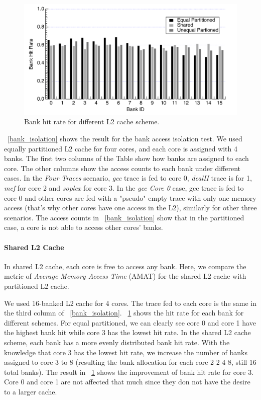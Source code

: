 \documentclass[12pt]{report}
\newcommand{\Fig}[1]{\figurename~\ref{#1}}
\newcommand{\Tbl}[1]{\tablename~\ref{#1}}
\begin{document}
\begin{figure}[t]
 \centering
\begin{minipage}[b]{0.8\textwidth}
 \centering
 \includegraphics[trim=0mm 0mm 0mm 0mm,clip,width=\linewidth]{figs/bank_hit_rate.pdf}
 \caption{Bank hit rate for different L2 cache scheme.}
 \label{bank_hit}
\end{minipage}
\end{figure}

\Tbl{bank_isolation} shows the result for the bank access isolation test. We used equally partitioned L2 cache for four cores, and each core is assigned with 4 banks. The first two columns of the Table show how banks are assigned to each core. The other columns show the access counts to each bank under different cases. In the \emph{Four Traces} scenario, \emph{gcc} trace is fed to core 0, \emph{dealII} trace is for 1, \emph{mcf} for core 2 and \emph{soplex} for core 3. In the \emph{gcc Core 0} case, gcc trace is fed to core 0 and other cores are fed with a "pseudo" empty trace with only one memory access (that's why other cores have one access in the L2), similarly for other three scenarios. The access counts in \Tbl{bank_isolation} show that in the partitioned case, a core is not able to access other cores' banks.

\paragraph{Shared L2 Cache}
In shared L2 cache, each core is free to access any bank. Here, we compare the metric of \emph{Average Memory Access Time} (AMAT) for the shared L2 cache with partitioned L2 cache.


We used 16-banked L2 cache for 4 cores. The trace fed to each core is the same in the third column of \Tbl{bank_isolation}. \Fig{bank_hit} shows the hit rate for each bank for different schemes. For equal partitioned, we can clearly see core 0 and core 1 have the highest bank hit while core 3 has the lowest hit rate. In the shared L2 cache scheme, each bank has a more evenly distributed bank hit rate. With the knowledge that core 3 has the lowest hit rate, we increase the number of banks assigned to core 3 to 8 (resulting the bank allocation for each core 2 2 4 8, still 16 total banks). The result in \Fig{bank_hit} shows the improvement of bank hit rate for core 3. Core 0 and core 1 are not affected that much since they don not have the desire to a larger cache. 
\end{document}

